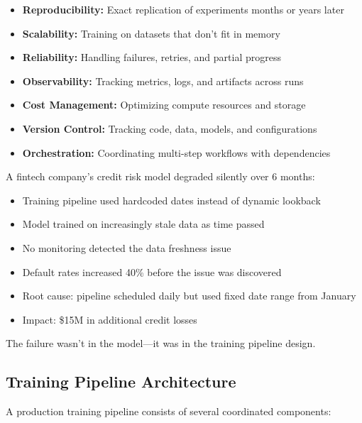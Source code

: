 \begin{itemize}
    \item \textbf{Reproducibility:} Exact replication of experiments months or years later
    \item \textbf{Scalability:} Training on datasets that don't fit in memory
    \item \textbf{Reliability:} Handling failures, retries, and partial progress
    \item \textbf{Observability:} Tracking metrics, logs, and artifacts across runs
    \item \textbf{Cost Management:} Optimizing compute resources and storage
    \item \textbf{Version Control:} Tracking code, data, models, and configurations
    \item \textbf{Orchestration:} Coordinating multi-step workflows with dependencies
\end{itemize}

\begin{example}
A fintech company's credit risk model degraded silently over 6 months:

\begin{itemize}
    \item Training pipeline used hardcoded dates instead of dynamic lookback
    \item Model trained on increasingly stale data as time passed
    \item No monitoring detected the data freshness issue
    \item Default rates increased 40\% before the issue was discovered
    \item Root cause: pipeline scheduled daily but used fixed date range from January
    \item Impact: \$15M in additional credit losses
\end{itemize}

The failure wasn't in the model—it was in the training pipeline design.
\end{example}

\subsection{Training Pipeline Architecture}

A production training pipeline consists of several coordinated components:

